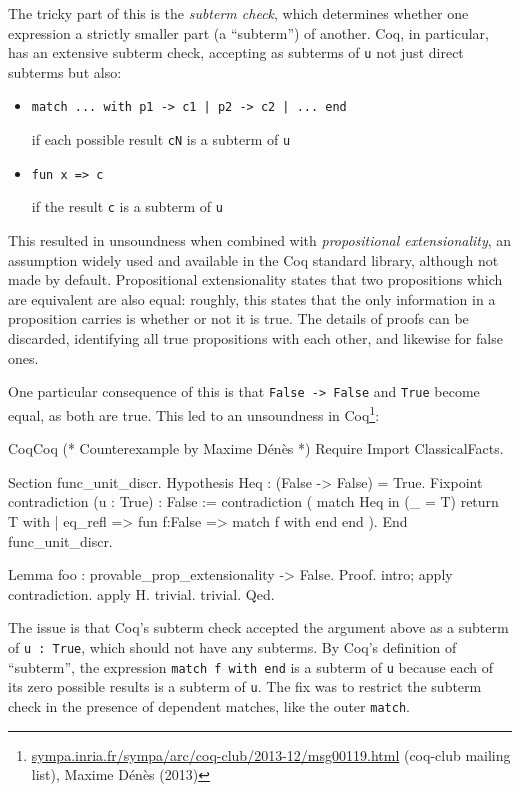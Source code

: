 \documentclass[11pt,oneside]{article}
\newenvironment{ceitemize}{\begin{itemize}}{\end{itemize}}
\newcommand{\code}[1]{\texttt{#1}}
\newenvironment{codegroup}
  {\par\addvspace{\medskipamount}%
   \tcbset{cebox/.append style={before skip=7pt, after skip=7pt}}}
  {\par\addvspace{\medskipamount}}
\begin{document}
The tricky part of this is the \emph{subterm check}, which determines whether one expression a strictly smaller part (a ``subterm'') of another. Coq, in particular, has an extensive subterm check, accepting as subterms of \code{u} not just direct subterms but also:

\begin{ceitemize}
\item \code{match ... with p1 -> c1 | p2 -> c2 | ... end}

if each possible result \code{cN} is a subterm of \code{u}
\item \code{fun x => c}

if the result \code{c} is a subterm of \code{u}
\end{ceitemize}

This resulted in unsoundness when combined with \emph{propositional extensionality}, an assumption widely used and available in the Coq standard library, although not made by default. Propositional extensionality states that two propositions which are equivalent are also equal: roughly, this states that the only information in a proposition carries is whether or not it is true. The details of proofs can be discarded, identifying all true propositions with each other, and likewise for false ones.

One particular consequence of this is that \code{False -> False} and \code{True} become equal, as both are true. This led to an unsoundness in Coq\footnote{\href{https://sympa.inria.fr/sympa/arc/coq-club/2013-12/msg00119.html}{sympa.inria.fr/\allowbreak{}sympa/\allowbreak{}arc/\allowbreak{}coq-club/\allowbreak{}2013-12/\allowbreak{}msg00119.html} (coq-club mailing list), Maxime Dénès (2013)}:

\begin{codegroup}
\begin{codebox}{Coq}{Coq}
(* Counterexample by Maxime Dénès *)
Require Import ClassicalFacts.

Section func_unit_discr.
Hypothesis Heq : (False -> False) = True.
Fixpoint contradiction (u : True) : False :=
  contradiction (
    match Heq in (_ = T) return T with
    | eq_refl => fun f:False => match f with end
    end
  ).
End func_unit_discr.

Lemma foo : provable_prop_extensionality -> False.
Proof.
  intro; apply contradiction.
  apply H.
  trivial.
  trivial.
Qed.
\end{codebox}
\end{codegroup}
The issue is that Coq's subterm check accepted the argument above as a subterm of \code{u : True}, which should not have any subterms. By Coq's definition of ``subterm'', the expression \code{match f with end} is a subterm of \code{u} because each of its zero possible results is a subterm of \code{u}. The fix was to restrict the subterm check in the presence of dependent matches, like the outer \code{match}.
\end{document}

